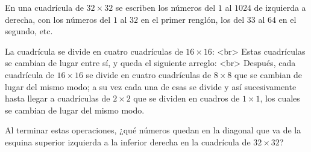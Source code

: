 En una cuadrícula de $32\times 32$ se escriben los números del $1$ al $1024$ de izquierda a derecha, con los números del $1$ al $32$ en el primer renglón, los del $33$ al $64$ en el segundo, etc. 

La cuadrícula se divide en cuatro cuadrículas de $16\times 16$:
<br>
Estas cuadrículas se cambian de lugar entre sí, y queda el siguiente arreglo:
<br>
Después, cada cuadrícula de $16\times 16$ se divide en cuatro cuadrículas de $8\times 8$ que se cambian de lugar del mismo modo; a su vez cada una de esas se divide y así sucesivamente hasta llegar a cuadrículas de $2\times 2$ que se dividen en cuadros de $1\times 1$, los cuales se cambian de lugar del mismo modo.

Al terminar estas operaciones, ¿qué números quedan en la diagonal que va de la esquina superior izquierda a la inferior derecha en la cuadrícula de $32\times 32$?